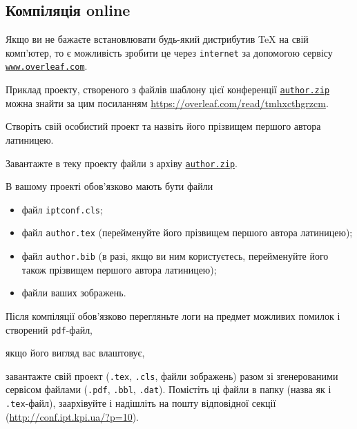 \documentclass[]{iptconf}
\def\templateurl{%
\href{https://drive.google.com/file/d/1YrrTXnwaIcydBJLFS5BM6uj-yosnkRl3/view}%
{\texttt{author.zip}}}
\begin{document}
\subsection{Компіляція online}

Якщо ви не бажаєте встановлювати будь-який дистрибутив \TeX{} на свій комп'ютер, то є
можливість зробити це через \texttt{internet} за допомогою сервісу	 \href{https://www.overleaf.com/}{\texttt{www.overleaf.com}}.

Приклад проекту, створеного з файлів шаблону  цієї конференції \templateurl{} можна знайти за цим посиланням
\url{https://overleaf.com/read/tmhxcthgrzcm}.

Створіть свій особистий проект та назвіть його прізвищем першого автора латиницею.

Завантажте в теку проекту файли з архіву \templateurl.

В вашому проекті обов'язково мають бути файли
\begin{itemize}
	\item файл \texttt{iptconf.cls};
	\item файл \texttt{author.tex} (перейменуйте його прізвищем першого автора латиницею);
	\item файл \texttt{author.bib} (в разі, якщо ви ним користуєтесь, перейменуйте його також прізвищем першого автора латиницею);
	\item файли ваших зображень.
\end{itemize}

\begin{tcolorbox}[breakable,enhanced,arc=0mm,colback=gray!5,colframe=red!80!black,leftrule=2mm]
	Після компіляції обов'язково перегляньте логи на предмет можливих помилок і створений \texttt{pdf}-файл,
\end{tcolorbox}

\noindent якщо його вигляд вас влаштовує,

\begin{tcolorbox}[breakable,enhanced,arc=0mm,colback=gray!5,colframe=red!80!black,leftrule=2mm]
	завантажте свій проект (\texttt{.tex}, \texttt{.cls}, файли зображень) разом зі згенерованими сервісом файлами (\texttt{.pdf}, \texttt{.bbl},
	\texttt{.dat}). Помістіть ці файли в папку (назва як і \texttt{.tex}-файл), заархівуйте і надішліть на пошту відповідної секції
	(\url{http://conf.ipt.kpi.ua/?p=10}).
\end{tcolorbox}
\end{document}
